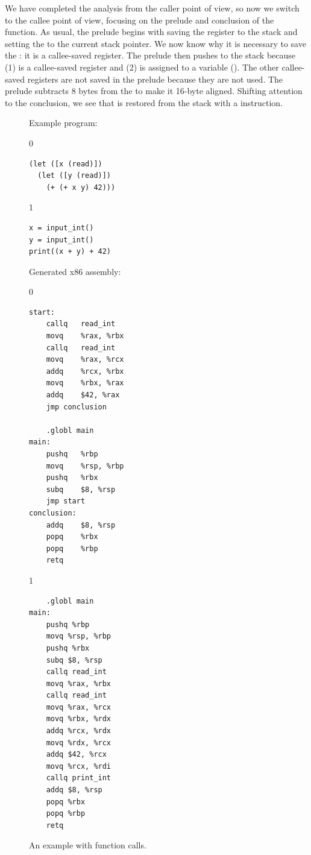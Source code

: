 \documentclass[7x10]{TimesAPriori_MIT}%
\def\racketEd{0}
\def\pythonEd{1}
\providecommand{\BookEdition}{1}
\let\edition\BookEdition
\newcommand{\pythonColor}[0]{}
\numberwithin{theorem}{chapter}
\numberwithin{definition}{chapter}
\numberwithin{equation}{chapter}
\begin{document}
We have completed the analysis from the caller point of view, so now
we switch to the callee point of view, focusing on the prelude and
conclusion of the  function. As usual, the prelude begins
with saving the  register to the stack and setting the
 to the current stack pointer. We now know why it is
necessary to save the : it is a callee-saved register.  The
prelude then pushes  to the stack because (1)  is
a callee-saved register and (2)  is assigned to a variable
(). The other callee-saved registers are not saved in the
prelude because they are not used. The prelude subtracts 8 bytes from
the  to make it 16-byte aligned. Shifting attention to the
conclusion, we see that  is restored from the stack with a
 instruction.

\begin{figure}[tp]
\begin{tcolorbox}[colback=white]
  
\begin{minipage}{0.45\textwidth}
Example \LangVar{} program:
{\if\edition\racketEd
\begin{lstlisting}
(let ([x (read)])
  (let ([y (read)])
    (+ (+ x y) 42)))
\end{lstlisting}
\fi}
{\if\edition\pythonEd\pythonColor
\begin{lstlisting}
x = input_int()
y = input_int()
print((x + y) + 42)
\end{lstlisting}
\fi}
\end{minipage}
\begin{minipage}{0.45\textwidth}
Generated x86 assembly:
{\if\edition\racketEd
\begin{lstlisting}
start:
	callq	read_int
	movq	%rax, %rbx
	callq	read_int
	movq	%rax, %rcx
	addq	%rcx, %rbx
	movq	%rbx, %rax
	addq	$42, %rax
	jmp conclusion

	.globl main
main:
	pushq	%rbp
	movq	%rsp, %rbp
	pushq	%rbx
	subq	$8, %rsp
	jmp start
conclusion:
	addq	$8, %rsp
	popq	%rbx
	popq	%rbp
	retq
\end{lstlisting}
\fi}
{\if\edition\pythonEd\pythonColor
\begin{lstlisting}
	.globl main
main:
	pushq %rbp
	movq %rsp, %rbp
	pushq %rbx
	subq $8, %rsp
	callq read_int
	movq %rax, %rbx
	callq read_int
	movq %rax, %rcx
	movq %rbx, %rdx
	addq %rcx, %rdx
	movq %rdx, %rcx
	addq $42, %rcx
	movq %rcx, %rdi
	callq print_int
	addq $8, %rsp
	popq %rbx
	popq %rbp
	retq
\end{lstlisting}
\fi}
\end{minipage}
\end{tcolorbox}

\caption{An example with function calls.}
  \label{fig:example-calling-conventions}
\end{figure}
\end{document}
